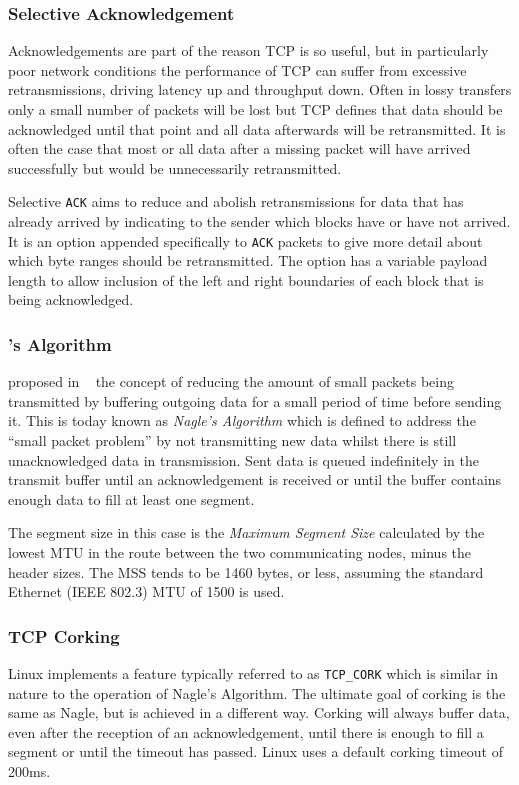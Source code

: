         \subsubsection{Selective Acknowledgement}\label{sec:sack}
            Acknowledgements are part of the reason \gls{TCP} is so useful, but in particularly poor network conditions the performance of \gls{TCP} can suffer from excessive retransmissions, driving latency up and throughput down. Often in lossy transfers only a small number of packets will be lost but \gls{TCP} defines that data should be acknowledged until that point and all data afterwards will be retransmitted. It is often the case that most or all data after a missing packet will have arrived successfully but would be unnecessarily retransmitted.

            Selective \texttt{ACK} aims to reduce and abolish retransmissions for data that has already arrived by indicating to the sender which blocks have or have not arrived. It is an option appended specifically to \texttt{ACK} packets to give more detail about which byte ranges should be retransmitted. The option has a variable payload length to allow inclusion of the left and right boundaries of each block that is being acknowledged.

        \subsubsection{\citeauthor{rfc896}'s Algorithm}
            \citeauthor*{rfc896} proposed in \citeyear{rfc896}~\cite{rfc896} the concept of reducing the amount of small packets being transmitted by buffering outgoing data for a small period of time before sending it. This is today known as \textit{Nagle's Algorithm} which is defined to address the ``small packet problem'' by not transmitting new data whilst there is still unacknowledged data in transmission. Sent data is queued indefinitely in the transmit buffer until an acknowledgement is received or until the buffer contains enough data to fill at least one segment.

            The segment size in this case is the \textit{Maximum Segment Size} calculated by the lowest \gls{MTU} in the route between the two communicating nodes, minus the header sizes. The MSS tends to be 1460 bytes, or less, assuming the standard Ethernet (IEEE 802.3) \gls{MTU} of 1500 is used.

        \subsubsection{TCP Corking}
            Linux implements a feature typically referred to as \texttt{\gls{TCP}\_CORK} which is similar in nature to the operation of Nagle's Algorithm. The ultimate goal of corking is the same as Nagle, but is achieved in a different way. Corking will always buffer data, even after the reception of an acknowledgement, until there is enough to fill a segment or until the timeout has passed.  Linux uses a default corking timeout of 200ms.

